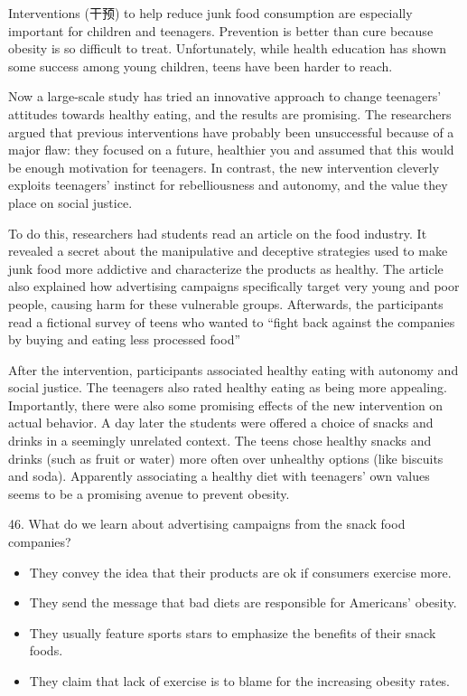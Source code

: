 \documentclass[UTF8,11pt]{ctexart}
\begin{document}
Interventions (干预) to help reduce junk food consumption are especially important for children and teenagers. Prevention is better than cure because obesity is so difficult to treat. Unfortunately, while health education has shown some success among young children, teens have been harder to reach.


Now a large-scale study has tried an innovative approach to change teenagers’ attitudes towards healthy eating, and the results are promising. The researchers argued that previous interventions have probably been unsuccessful because of a major flaw: they focused on a future, healthier you and assumed that this would be enough motivation for teenagers. In contrast, the new intervention cleverly exploits teenagers’ instinct for rebelliousness and autonomy, and the value they place on social justice.


To do this, researchers had students read an article on the food industry. It revealed a secret about the manipulative and deceptive strategies used to make junk food more addictive and characterize the products as healthy. The article also explained how advertising campaigns specifically target very young and poor people, causing harm for these vulnerable groups. Afterwards, the participants read a fictional survey of teens who wanted to “fight back against the companies by buying and eating less processed food”


After the intervention, participants associated healthy eating with autonomy and social justice. The teenagers also rated healthy eating as being more appealing. Importantly, there were also some promising effects of the new intervention on actual behavior. A day later the students were offered a choice of snacks and drinks in a seemingly unrelated context. The teens chose healthy snacks and drinks (such as fruit or water) more often over unhealthy options (like biscuits and soda). Apparently associating a healthy diet with teenagers’ own values seems to be a promising avenue to prevent obesity.


46. What do we learn about advertising campaigns from the snack food companies?


\begin{itemize}[leftmargin=2em,itemsep=.2em,topsep=.4em]\item[A.] They convey the idea that their products are ok if consumers exercise more.
\item[B.] They send the message that bad diets are responsible for Americans’ obesity.
\item[C.] They usually feature sports stars to emphasize the benefits of their snack foods.
\item[D.] They claim that lack of exercise is to blame for the increasing obesity rates.
\end{itemize}
\end{document}
